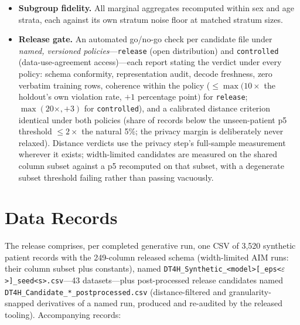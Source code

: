 \documentclass[11pt,a4paper]{article}
\newcommand{\eps}{\ensuremath{\varepsilon}}
\begin{document}
\begin{itemize}
attack's CI upper bound; a who-is-at-risk profile (within-stratum AUC across
member-atypicality quartiles, with non-members binned by the same cut points, so
population density cannot masquerade as leakage); and an attack-derived empirical
lower bound $\hat\eps$ on the effective privacy loss
(Clopper--Pearson-bounded TPR/FPR ratios); (iii) attribute inference from
quasi-identifiers (age, sex, admission year) under one shared encoder fitted on
the training split, reported as \emph{membership advantage} against the real
holdout's majority-class baseline; (iv) singling-out and linkability risks via
Anonymeter \citep{giomi2023unified}, with all frames compared in the released
(decoded) representation.
\item \textbf{Subgroup fidelity.} All marginal aggregates recomputed within sex
and age strata, each against its own stratum noise floor at matched stratum sizes.
\item \textbf{Release gate.} An automated go/no-go check per candidate file under
\emph{named, versioned policies}---\texttt{release} (open distribution) and
\texttt{controlled} (data-use-agreement access)---each report stating the verdict
under every policy: schema conformity, representation audit, decode freshness,
zero verbatim training rows, coherence within the policy
($\leq \max(10\times$ the holdout's own violation rate, $+1$ percentage point$)$
for \texttt{release}; $\max(20\times, +3)$ for \texttt{controlled}), and a
calibrated distance criterion identical under both policies (share of records
below the unseen-patient p5 threshold $\leq 2\times$ the natural 5\%; the privacy
margin is deliberately never relaxed). Distance verdicts use the privacy step's
full-sample measurement wherever it exists; width-limited candidates are measured
on the shared column subset against a p5 recomputed on that subset, with a
degenerate subset threshold failing rather than passing vacuously.
\end{itemize}

\section{Data Records}

The release comprises, per completed generative run, one CSV of 3{,}520 synthetic
patient records with the 249-column released schema (width-limited AIM runs: their
column subset plus constants), named
\texttt{DT4H\_Synthetic\_<model>[\_eps<\eps>]\_seed<s>.csv}---43 datasets---plus
post-processed release candidates named \texttt{DT4H\_Candidate\_*\_postprocessed.csv}
(distance-filtered and granularity-snapped derivatives of a named run, produced and
re-audited by the released tooling). Accompanying records:
\end{document}

